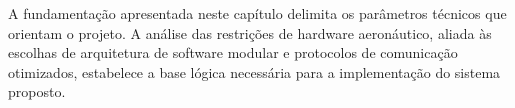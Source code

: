 A fundamentação apresentada neste capítulo delimita os parâmetros técnicos que orientam o projeto. A análise das restrições de hardware aeronáutico, aliada às escolhas de arquitetura de software modular e protocolos de comunicação otimizados, estabelece a base lógica necessária para a implementação do sistema proposto. 
